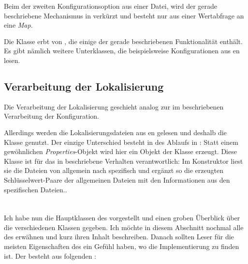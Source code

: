 Beim der zweiten Konfigurationsoption aus einer Datei, wird der gerade beschriebene Mechanismus in  verkürzt und besteht nur aus einer Wertabfrage an eine \emph{Map}.

Die Klasse  erbt von , die einige der gerade beschriebenen Funktionalität enthält. Es gibt nämlich weitere Unterklassen, die beispielsweise Konfigurationen aus en lesen.

\subsection{Verarbeitung der Lokalisierung}
Die Verarbeitung der Lokalisierung geschieht analog zur im  beschriebenen Verarbeitung der Konfiguration.

Allerdings werden die Lokalisierungsdateien aus en gelesen und deshalb die Klasse  genutzt. Der einzige Unterschied besteht in  des Ablaufs in : Statt einem gewöhnlichen \emph{Properties}-Objekt wird hier ein Objekt der Klasse  erzeugt. Diese Klasse ist für das in  beschriebene Verhalten verantwortlich: Im Konstruktor liest sie die Dateien von allgemein nach spezifisch und ergänzt so die erzeugten Schlüsselwert-Paare der allgemeinen Dateien mit den Informationen aus den spezifischen Dateien..

\section{\packages}
Ich habe nun die Hauptklassen des \md vorgestellt und einen groben Überblick über die verschiedenen Klassen gegeben. Ich möchte in diesem Abschnitt nochmal alle \packages des \md erwähnen und kurz ihren Inhalt beschreiben. Danach sollten Leser für die meisten Eigenschaften des \md ein Gefühl haben, wo die Implementierung zu finden ist. Der \md besteht aus folgenden \packages:

